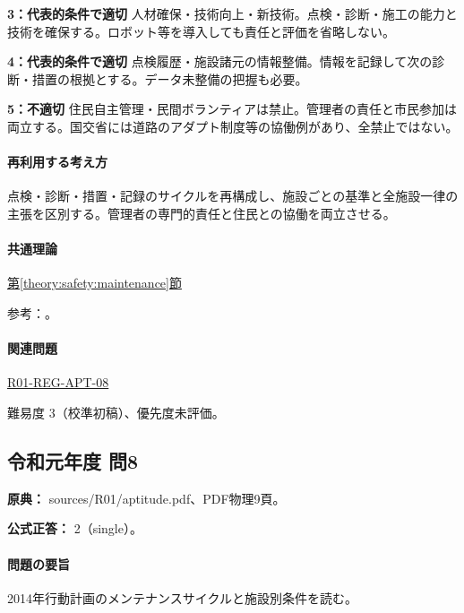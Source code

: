 \noindent\textbf{3：代表的条件で適切} 人材確保・技術向上・新技術。点検・診断・施工の能力と技術を確保する。ロボット等を導入しても責任と評価を省略しない。\par

\noindent\textbf{4：代表的条件で適切} 点検履歴・施設諸元の情報整備。情報を記録して次の診断・措置の根拠とする。データ未整備の把握も必要。\par

\noindent\textbf{5：不適切} 住民自主管理・民間ボランティアは禁止。管理者の責任と市民参加は両立する。国交省には道路のアダプト制度等の協働例があり、全禁止ではない。\par

\paragraph{再利用する考え方} 点検・診断・措置・記録のサイクルを再構成し、施設ごとの基準と全施設一律の主張を区別する。管理者の専門的責任と住民との協働を両立させる。

\paragraph{共通理論} \hyperref[theory:safety:maintenance]{第\ref*{theory:safety:maintenance}節}

\par 参考：\cite{eng52_infra2014,eng52_adopt}。

\paragraph{関連問題} \hyperref[q:r01-reg-apt-08]{R01-REG-APT-08}

\par 難易度 3（校準初稿）、優先度未評価。

\subsection{令和元年度 問8}
\label{q:r01-reg-apt-08}

\noindent\textbf{原典：} sources/R01/aptitude.pdf、PDF物理9頁。

\textbf{公式正答：} 2（single）。

\paragraph{問題の要旨} 2014年行動計画のメンテナンスサイクルと施設別条件を読む。

